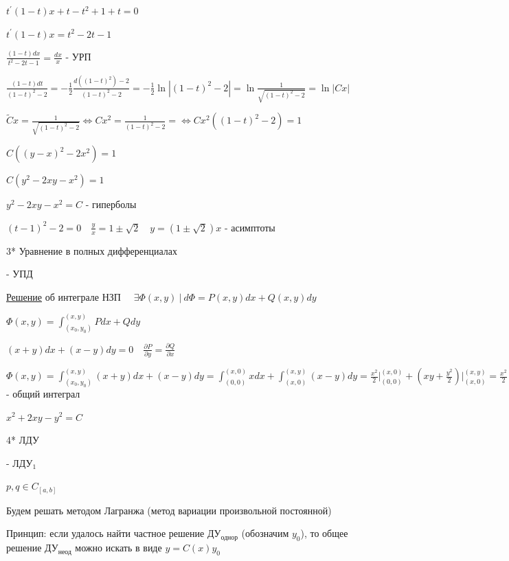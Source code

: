 \documentclass[12pt]{article}
\begin{document}
    $t^\prime (1 - t) x + t - t^2 + 1 + t = 0$

    $t^\prime (1 - t) x = t^2 - 2t - 1$

    $\frac{(1 - t) dx}{t^2 - 2t - 1} = \frac{dx}{x}$ - УРП

    $\frac{(1 - t)dt}{(1 - t)^2 - 2} = -\frac{1}{2}\frac{d((1 - t)^2) - 2}{(1 - t)^2 - 2} = -\frac{1}{2}\ln|(1 - t)^2 - 2| = \ln\frac{1}{\sqrt{(1 - t)^2 - 2}} = \ln|Cx|$

    $\tilde{C}x = \frac{1}{\sqrt{(1 - t)^2 - 2}} \Longleftrightarrow Cx^2 = \frac{1}{(1 - t)^2 - 2} = \Longleftrightarrow Cx^2 ((1 - t)^2 - 2) = 1$

    $C ((y - x)^2 - 2x^2) = 1$

    $C (y^2 - 2xy - x^2) = 1$

    $y^2 - 2xy - x^2 = C$ - гиперболы

    $(t - 1)^2 - 2 = 0 \quad \frac{y}{x} = 1 \pm \sqrt{2} \quad y = (1 \pm \sqrt{2})x$ - асимптоты

    3* Уравнение в полных дифференциалах

    \Def {} - УПД

    \vspace{5mm}

    \underline{Решение} \Mems \Ths об интеграле НЗП $\quad \exists \Phi(x, y)\ | \ d\Phi = P(x, y)dx + Q(x, y)dy$

    $\Phi(x, y) = \int^{(x,y)}_{(x_0,y_0)} Pdx + Qdy$

    \Ex $(x + y)dx + (x - y)dy = 0 \quad \frac{\partial P}{\partial y} = \frac{\partial Q}{\partial x}$

    $\Phi(x, y) = \int^{(x, y)}_{(x_0,y_0)} (x + y)dx + (x - y)dy =
    \int^{(x,0)}_{(0,0)} xdx + \int^{(x,y)}_{(x,0)} (x - y)dy = \frac{x^2}{2} \Big|_{(0, 0)}^{(x, 0)} +
    (xy + \frac{y^2}{2}) \Big|_{(x, 0)}^{(x, y)} = \frac{x^2}{2} + xy - \frac{y^2}{2} + C$ - общий интеграл

    $x^2 + 2xy - y^2 = C$

    4* ЛДУ

    \Def {} - ЛДУ$_1$

    $p, q \in C_{[a, b]}$

    \Nota Будем решать методом Лагранжа (метод вариации произвольной постоянной)

    Принцип: если удалось найти частное решение ДУ$_\text{однор}$ (обозначим $y_0$), то общее решение ДУ$_\text{неод}$
    можно искать в виде $y = C(x)y_0$
\end{document}
